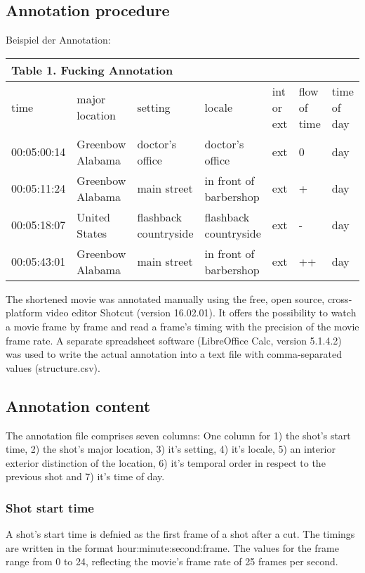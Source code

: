 \documentclass[10pt,a4paper,twocolumn]{article}
\begin{document}
\subsection*{Annotation procedure}
Beispiel der Annotation: 
\begin{table}[h]
\begin{tabular}{lllllll}
\multicolumn{7}{l}{Table 1. Fucking Annotation}\tabularnewline
\hline 
time & major location & setting & locale & int or ext & flow of time & time of day\tabularnewline
00:05:00:14  & Greenbow Alabama  & doctor's office  & doctor's office  & ext  & 0 & day\tabularnewline
00:05:11:24  & Greenbow Alabama  & main street  & in front of barbershop  & ext  & + & day\tabularnewline
00:05:18:07  & United States  & flashback countryside  & flashback countryside  & ext  & - & day\tabularnewline
00:05:43:01 & Greenbow Alabama  & main street  & in front of barbershop  & ext  & ++ & day\tabularnewline
\hline 
\end{tabular}
\end{table}


The shortened movie was annotated manually using the free, open source,
cross-platform video editor Shotcut (version 16.02.01). It offers
the possibility to watch a movie frame by frame and read a frame's timing
with the precision of the movie frame rate. A separate spreadsheet
software (LibreOffice Calc, version 5.1.4.2) was used to write the
actual annotation into a text file with comma-separated values (structure.csv). 

\subsection*{Annotation content}

The annotation file comprises seven columns: One column for 1) the
shot's start time, 2) the shot's major location, 3) it's setting,
4) it's locale, 5) an interior exterior distinction of the location,
6) it's temporal order in respect to the previous shot and 7) it's
time of day. 

\subsubsection*{Shot start time}

A shot's start time is defnied as the first frame of a shot after
a cut. The timings are written in the format hour:minute:second:frame.
The values for the frame range from 0 to 24, reflecting the movie's
frame rate of 25 frames per second. 
\end{document}
